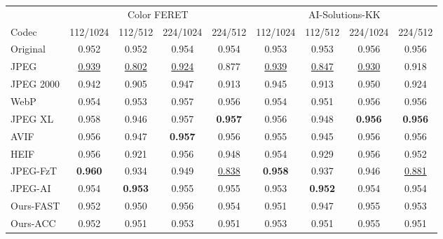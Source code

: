 \begin{tabular}{lcccccccc}
\toprule
 & \multicolumn{4}{c}{Color FERET} & \multicolumn{4}{c}{AI-Solutions-KK} \\
\cmidrule(lr){2-5}\cmidrule(lr){6-9}
Codec & 112/1024 & 112/512 & 224/1024 & 224/512 & 112/1024 & 112/512 & 224/1024 & 224/512 \\
\midrule
Original & 0.952 & 0.952 & 0.954 & 0.954 & 0.953 & 0.953 & 0.956 & 0.956 \\
\midrule
JPEG & \cellcolor{red!22}\underline{0.939} & \cellcolor{red!22}\underline{0.802} & \cellcolor{red!22}\underline{0.924} & 0.877 & \cellcolor{red!22}\underline{0.939} & \cellcolor{red!22}\underline{0.847} & \cellcolor{red!22}\underline{0.930} & 0.918 \\
JPEG 2000 & 0.942 & 0.905 & 0.947 & 0.913 & 0.945 & 0.913 & 0.950 & 0.924 \\
WebP & 0.954 & 0.953 & 0.957 & 0.956 & 0.954 & 0.951 & 0.956 & 0.956 \\
JPEG XL & 0.958 & 0.946 & 0.957 & \cellcolor{green!25}\textbf{0.957} & 0.956 & 0.948 & \cellcolor{green!25}\textbf{0.956} & \cellcolor{green!25}\textbf{0.956} \\
AVIF & 0.956 & 0.947 & \cellcolor{green!25}\textbf{0.957} & 0.956 & 0.955 & 0.945 & 0.956 & 0.956 \\
HEIF & 0.956 & 0.921 & 0.956 & 0.948 & 0.954 & 0.929 & 0.956 & 0.952 \\
JPEG-FzT & \cellcolor{green!25}\textbf{0.960} & 0.934 & 0.949 & \cellcolor{red!22}\underline{0.838} & \cellcolor{green!25}\textbf{0.958} & 0.937 & 0.946 & \cellcolor{red!22}\underline{0.881} \\
JPEG-AI & 0.954 & \cellcolor{green!25}\textbf{0.953} & 0.955 & 0.955 & 0.953 & \cellcolor{green!25}\textbf{0.952} & 0.954 & 0.954 \\
Ours-FAST & 0.952 & 0.950 & 0.956 & 0.954 & 0.951 & 0.947 & 0.955 & 0.953 \\
Ours-ACC & 0.952 & 0.951 & 0.953 & 0.951 & 0.953 & 0.951 & 0.955 & 0.951 \\
\bottomrule
\end{tabular}
